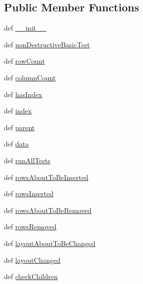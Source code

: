 \subsection*{Public Member Functions}
\begin{DoxyCompactItemize}
\item 
def \hyperlink{classmodeltest_1_1ModelTest_a22376428f1291d60d95b29c89b8269ac}{\+\_\+\+\_\+init\+\_\+\+\_\+}
\item 
def \hyperlink{classmodeltest_1_1ModelTest_a088f16471c62f57411b1560c6abb13c8}{non\+Destructive\+Basic\+Test}
\item 
def \hyperlink{classmodeltest_1_1ModelTest_a63fc8f4e60ae03582724d54daba4f9fe}{row\+Count}
\item 
def \hyperlink{classmodeltest_1_1ModelTest_abdefcd31cf51f2ec05a68816548e7cc1}{column\+Count}
\item 
def \hyperlink{classmodeltest_1_1ModelTest_af6eb1971a9675f915af5c32c069952d3}{has\+Index}
\item 
def \hyperlink{classmodeltest_1_1ModelTest_a92917017e2e3258c19e36bda944d6fed}{index}
\item 
def \hyperlink{classmodeltest_1_1ModelTest_a70ba144ec5c185672d81a6b952876395}{parent}
\item 
def \hyperlink{classmodeltest_1_1ModelTest_a3cf74ea54612c2821fd0da923cdcf51f}{data}
\item 
def \hyperlink{classmodeltest_1_1ModelTest_a2eb8acb6ab243ddaec7ea5042a3447a8}{run\+All\+Tests}
\item 
def \hyperlink{classmodeltest_1_1ModelTest_ab18ebff6fc38c3c8897462b7430876db}{rows\+About\+To\+Be\+Inserted}
\item 
def \hyperlink{classmodeltest_1_1ModelTest_aa6a752a8df7042bd16aed87c51161a60}{rows\+Inserted}
\item 
def \hyperlink{classmodeltest_1_1ModelTest_afad4363880f6b0b609c4903c6a760f71}{rows\+About\+To\+Be\+Removed}
\item 
def \hyperlink{classmodeltest_1_1ModelTest_a96df30dc1abf3a80f716f38b1963f8f9}{rows\+Removed}
\item 
def \hyperlink{classmodeltest_1_1ModelTest_a98617678a9f85f108f5e9dc7d7e3c5af}{layout\+About\+To\+Be\+Changed}
\item 
def \hyperlink{classmodeltest_1_1ModelTest_a730df5fa4ecff94e003c07b0f7307926}{layout\+Changed}
\item 
def \hyperlink{classmodeltest_1_1ModelTest_a236b3241f2bc6264c9e1ece60ae1d738}{check\+Children}
\end{DoxyCompactItemize}
